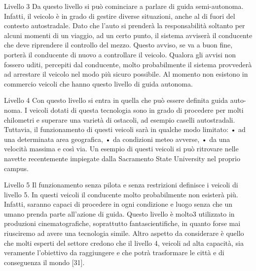 \documentclass[14pt]{extarticle}
\begin{document}
\begin{itemize}
Livello 3
Da questo livello si può cominciare a parlare di guida semi-autonoma.
Infatti, il veicolo è in grado di gestire diverse situazioni, anche al di fuori
del contesto autostradale. Dato che l’auto si prenderà la responsabilità
soltanto per alcuni momenti di un viaggio, ad un certo punto, il sistema
avviserà il conducente che deve riprendere il controllo del mezzo. Questo
avviso, se va a buon fine, porterà il conducente di nuovo a controllare
il veicolo. Qualora gli avvisi non fossero uditi, percepiti dal conducente,
molto probabilmente il sistema provvederà ad arrestare il veicolo nel
modo più sicuro possibile.
Al momento non esistono in commercio veicoli che hanno questo livello
di guida autonoma.

Livello 4
Con questo livello si entra in quella che può essere definita guida auto-
noma. I veicoli dotati di questa tecnologia sono in grado di procedere
per molti chilometri e superare una varietà di ostacoli, ad esempio caselli
autostradali.
Tuttavia, il funzionamento di questi veicoli sarà in qualche modo limitato:
• ad una determinata area geografica,
• da condizioni meteo avverse,
• da una velocità massima e così via.
Un esempio di questi veicoli si può ritrovare nelle navette recentemente
impiegate dalla Sacramento State University nel proprio campus.

Livello 5
Il funzionamento senza pilota e senza restrizioni definisce i veicoli di
livello 5. In questi veicoli il conducente molto probabilmente non esisterà
più. Infatti, saranno capaci di procedere in ogni condizione e luogo senza
che un umano prenda parte all’azione di guida. Questo livello è molto3
utilizzato in produzioni cinematografiche, soprattutto fantascientifiche,
in quanto forse mai riusciremo ad avere una tecnologia simile.
Altro aspetto da considerare è quello che molti esperti del settore credono che il livello 4, veicoli ad alta capacità, sia veramente l’obiettivo da
raggiungere e che potrà trasformare le città e di conseguenza il mondo
[31].


\end{itemize}
\end{document}

